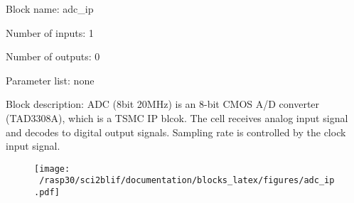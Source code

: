 \pagebreak

Block name: adc\_ip

Number of inputs: 1

Number of outputs: 0

Parameter list: none

Block description: 
ADC (8bit 20MHz) is an 8-bit CMOS A/D converter (TAD3308A), which is a TSMC IP blcok. The cell receives analog input signal and decodes to digital output signals. Sampling rate is controlled by the clock input signal.

\begin{figure}[H]  %
\texttt{[image: ~/rasp30/sci2blif/documentation/blocks\_latex/figures/adc\_ip.pdf]}
\end{figure}

